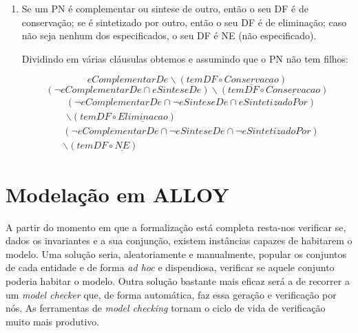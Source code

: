 \documentclass[tikz,runningheads,a4paper]{llncs}
\begin{document}
\begin{enumerate}
    \item Se um PN é complementar ou sintese de outro, então o seu DF é de conservação; se é sintetizado por outro, então o seu DF é de eliminação; caso não seja nenhum dos especificados, o seu DF é NE (não especificado).
    
    Dividindo em várias cláusulas obtemos e assumindo que o PN não tem filhos:
    
    \begin{equation}
        eComplementarDe \backslash (temDF \circ \underline{Conservacao})
    \end{equation}{}
    \begin{equation}
        (\neg eComplementarDe \cap eSinteseDe) \backslash (temDF \circ \underline{Conservacao})
    \end{equation}{}
    \begin{equation}
    \begin{split}
        & (\neg eComplementarDe \cap \neg eSinteseDe \cap eSintetizadoPor) \\
        & \backslash (temDF \circ \underline{Eliminacao})
    \end{split}{}
    \end{equation}{}
    \begin{equation}
    \begin{split}
        & (\neg eComplementarDe \cap \neg eSinteseDe \cap \neg eSintetizadoPor) \\
        & \backslash (temDF \circ \underline{NE})
    \end{split}{}
    \end{equation}{}
\end{enumerate}

\section{Modelação em ALLOY} \label{SecAlloy}

A partir do momento em que a formalização está completa resta-nos verificar se, dados os invariantes e a sua conjunção, existem instâncias capazes de habitarem o modelo. Uma solução seria, aleatoriamente e manualmente, popular os conjuntos de cada entidade e de forma \textit{ad hoc} e dispendiosa, verificar se aquele conjunto poderia habitar o modelo. Outra solução bastante mais eficaz será a de recorrer a um \textit{model checker} que, de forma automática, faz essa geração e verificação por nós. As ferramentas de \textit{model checking} tornam o ciclo de vida de verificação muito mais produtivo.
\end{document}
